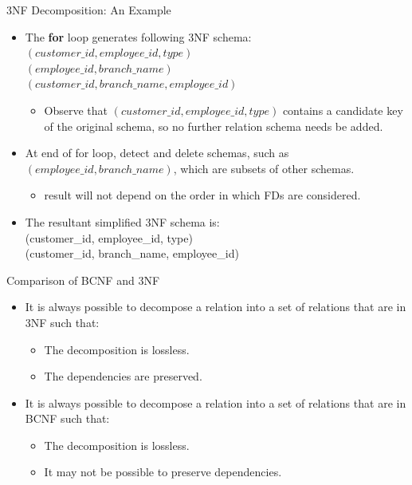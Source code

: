 \documentclass{beamer}
\begin{document}
\begin{frame}[fragile]{3NF Decomposition: An Example}
    \footnotesize
    \begin{itemize}
        \item The \textbf{for} loop generates following 3NF schema: \\
            \quad $(customer\_id, employee\_id, type)$ \\
            \quad $(employee\_id, branch\_name)$ \\
            \quad $(customer\_id, branch\_name, employee\_id)$
                \begin{itemize}
                    \item Observe that $(customer\_id, employee\_id, type)$ contains a candidate key of the original schema, so no further relation schema needs be added.
                \end{itemize}
        \item At end of for loop, detect and delete schemas, such as $(employee\_id, branch\_name)$, which are subsets of other schemas.
            \begin{itemize}
                \item result will not depend on the order in which FDs are considered.
            \end{itemize}
        \item The resultant simplified 3NF schema is: \\
            \quad (customer\_id, employee\_id, type) \\
            \quad (customer\_id, branch\_name, employee\_id)
    \end{itemize}
\end{frame}

\begin{frame}{Comparison of BCNF and 3NF}
    \begin{itemize}
        \item It is always possible to decompose a relation into a set of relations that are in 3NF such that:
            \begin{itemize}
                \item The decomposition is lossless.
                \item The dependencies are preserved.
            \end{itemize}
        \item It is always possible to decompose a relation into a set of relations that are in BCNF such that:
            \begin{itemize}
                \item The decomposition is lossless.
                \item It may not be possible to preserve dependencies.
            \end{itemize}
    \end{itemize}
\end{frame}
\end{document}
